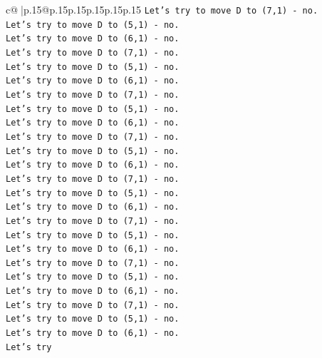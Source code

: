 \documentclass{article}
\begin{document}
{\begin{supertabular}{c@{$\;$}|p{.15\linewidth}@{}p{.15\linewidth}p{.15\linewidth}p{.15\linewidth}p{.15\linewidth}p{.15\linewidth}}
{{{\texttt{Let's try to move D to (7,1) {-} no.} \\
\texttt{Let's try to move D to (5,1) {-} no.} \\
\texttt{Let's try to move D to (6,1) {-} no.} \\
\texttt{Let's try to move D to (7,1) {-} no.} \\
\texttt{Let's try to move D to (5,1) {-} no.} \\
\texttt{Let's try to move D to (6,1) {-} no.} \\
\texttt{Let's try to move D to (7,1) {-} no.} \\
\texttt{Let's try to move D to (5,1) {-} no.} \\
\texttt{Let's try to move D to (6,1) {-} no.} \\
\texttt{Let's try to move D to (7,1) {-} no.} \\
\texttt{Let's try to move D to (5,1) {-} no.} \\
\texttt{Let's try to move D to (6,1) {-} no.} \\
\texttt{Let's try to move D to (7,1) {-} no.} \\
\texttt{Let's try to move D to (5,1) {-} no.} \\
\texttt{Let's try to move D to (6,1) {-} no.} \\
\texttt{Let's try to move D to (7,1) {-} no.} \\
\texttt{Let's try to move D to (5,1) {-} no.} \\
\texttt{Let's try to move D to (6,1) {-} no.} \\
\texttt{Let's try to move D to (7,1) {-} no.} \\
\texttt{Let's try to move D to (5,1) {-} no.} \\
\texttt{Let's try to move D to (6,1) {-} no.} \\
\texttt{Let's try to move D to (7,1) {-} no.} \\
\texttt{Let's try to move D to (5,1) {-} no.} \\
\texttt{Let's try to move D to (6,1) {-} no.} \\
\texttt{Let's try} \\
            }
        }
    }
     \\ \\


\end{supertabular}}
\end{document}
